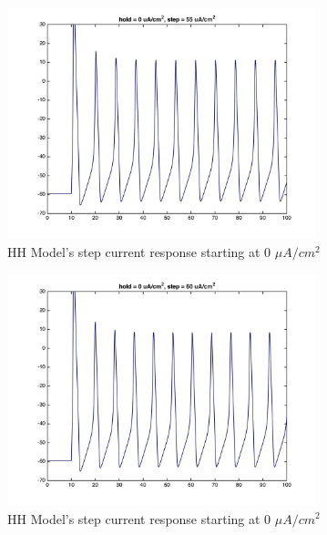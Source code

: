 \documentclass{beamer}
\begin{document}
\begin{frame}
  \begin{figure}
    \centering
    \includegraphics[width = 0.8\textwidth]{./images/current_0_55.jpg}
    \caption{HH Model's step current response starting at 0 $\mu A/cm^2$}
  \end{figure}
\end{frame}


\begin{frame}
  \begin{figure}
    \centering
    \includegraphics[width = 0.8\textwidth]{./images/current_0_60.jpg}
    \caption{HH Model's step current response starting at 0 $\mu A/cm^2$}
  \end{figure}
\end{frame}
\end{document}
